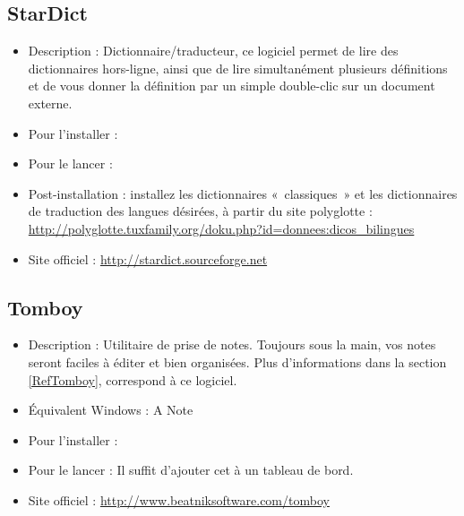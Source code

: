 \subsection{StarDict}
\begin{itemize}
\begingroup
{}
\item Description : Dictionnaire/traducteur, ce logiciel permet de lire des dictionnaires hors-ligne, ainsi que de lire simultanément plusieurs définitions et de vous donner la définition par un simple double-clic sur un document externe.{\par}
\item Pour l'installer : 
\item Pour le lancer : 
\item Post-installation : installez les dictionnaires «~classiques~» et les dictionnaires de traduction des langues désirées, à partir du site polyglotte : \url{http://polyglotte.tuxfamily.org/doku.php?id=donnees:dicos_bilingues}{\par}
\item Site officiel : \url{http://stardict.sourceforge.net}{\par}
\endgroup
\end{itemize}

\subsection{Tomboy}
\begin{itemize}
\begingroup
{}
\item Description : Utilitaire de prise de notes. Toujours sous la main, vos notes seront faciles à éditer et bien organisées. Plus d'informations dans la section \ref{RefTomboy}, correspond à ce logiciel.{\par}
\endgroup
\item Équivalent Windows : A Note{\par}
\item Pour l'installer : 
\item Pour le lancer : Il suffit d'ajouter cet  à un tableau de bord.{\par}
\item Site officiel : \url{http://www.beatniksoftware.com/tomboy}{\par}
\end{itemize}
